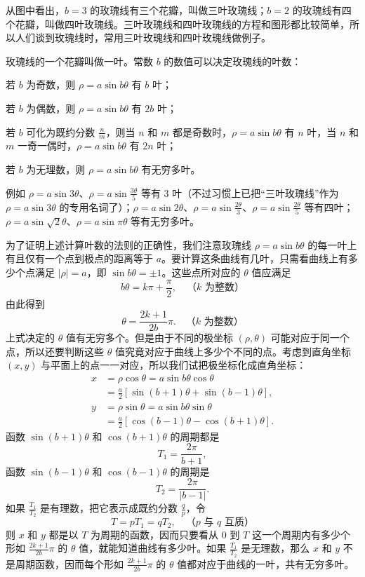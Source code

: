 从图中看出，$b=3$ 的玫瑰线有三个花瓣，叫做三叶玫瑰线；$b=2$ 的玫瑰线有四个花瓣，叫做四叶玫瑰线。三叶玫瑰线和四叶玫瑰线的方程和图形都比较简单，所以人们谈到玫瑰线时，常用三叶玫瑰线和四叶玫瑰线做例子。

玫瑰线的一个花瓣叫做一叶。常数 $b$ 的数值可以决定玫瑰线的叶数：

若 $b$ 为奇数，则 $\rho = a\sin b\theta$ 有 $b$ 叶；

若 $b$ 为偶数，则 $\rho = a\sin b\theta$ 有 $2b$ 叶；

若 $b$ 可化为既约分数 $\frac{n}{m}$，则当 $n$ 和 $m$ 都是奇数时，$\rho = a\sin b\theta$ 有 $n$ 叶，当 $n$ 和 $m$ 一奇一偶时，$\rho = a\sin b\theta$ 有 $2n$ 叶；

若 $b$ 为无理数，则 $\rho = a\sin b\theta$ 有无穷多叶。

例如 $\rho = a\sin 3\theta$、$\rho = a\sin\frac{3\theta}{5}$ 等有 3 叶（不过习惯上已把“三叶玫瑰线”作为 $\rho = a\sin 3\theta$ 的专用名词了）；$\rho = a\sin 2\theta$、$\rho = a\sin\frac{2\theta}{3}$、$\rho = a\sin\frac{2\theta}{5}$ 等有四叶；$\rho = a\sin\sqrt{2}\theta$、$\rho = a\sin\pi\theta$ 等有无穷多叶。

为了证明上述计算叶数的法则的正确性，我们注意玫瑰线 $\rho = a\sin b\theta$ 的每一叶上有且仅有一个点到极点的距离等于 $a$。要计算这条曲线有几叶，只需看曲线上有多少个点满足 $|\rho|=a$，即 $\sin b\theta = \pm 1$。这些点所对应的 $\theta$ 值应满足
\[
  b\theta = k\pi + \frac{\pi}{2},\quad \text{（$k$ 为整数）}
\]
由此得到
\[
  \theta = \frac{2k+1}{2b}\pi.\quad \text{（$k$ 为整数）}
\]
上式决定的 $\theta$ 值有无穷多个。但是由于不同的极坐标 $(\rho, \theta)$ 可能对应于同一个点，所以还要判断这些 $\theta$ 值究竟对应于曲线上多少个不同的点。考虑到直角坐标 $(x, y)$ 与平面上的点一一对应，所以我们试把极坐标化成直角坐标：
\begin{align*}
  x &= \rho\cos\theta = a\sin b\theta\cos\theta \\
    &= \frac{a}{2}[\sin(b+1)\theta + \sin(b-1)\theta], \\
  y &= \rho\sin\theta = a\sin b\theta\sin\theta \\
    &= \frac{a}{2}[\cos(b-1)\theta - \cos(b+1)\theta].
\end{align*}
函数 $\sin(b+1)\theta$ 和 $\cos(b+1)\theta$ 的周期都是
\[
  T_1 = \frac{2\pi}{b+1},
\]
函数 $\sin(b-1)\theta$ 和 $\cos(b-1)\theta$ 的周期是
\[
  T_2 = \frac{2\pi}{|b-1|}.
\]
如果 $\frac{T_1}{T_2}$ 是有理数，把它表示成既约分数 $\frac{q}{p}$，令
\[
  T = pT_1 = qT_2,\quad \text{（$p$ 与 $q$ 互质）}
\]
则 $x$ 和 $y$ 都是以 $T$ 为周期的函数，因而只要看从 $0$ 到 $T$ 这一个周期内有多少个形如 $\frac{2k+1}{2b}\pi$ 的 $\theta$ 值，就能知道曲线有多少叶。如果 $\frac{T_1}{T_2}$ 是无理数，那么 $x$ 和 $y$ 不是周期函数，因而每个形如 $\frac{2k+1}{2b}\pi$ 的 $\theta$ 值都对应于曲线的一叶，共有无穷多叶。

